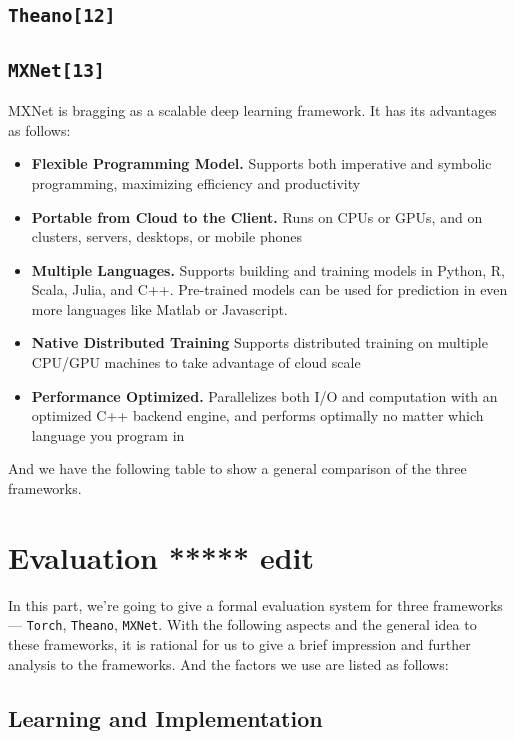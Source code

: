 \documentclass[12pt]{article}
\begin{document}
\subsection{\texttt{Theano[12]}}

\subsection{\texttt{MXNet[13]}}
MXNet is bragging as a scalable deep learning framework. It has its advantages as follows:
\begin{itemize}	
	\item {\bf Flexible Programming Model.} Supports both imperative and symbolic programming, maximizing efficiency and productivity
	\item {\bf Portable from Cloud to the Client.} Runs on CPUs or GPUs, and on clusters, servers, desktops, or mobile phones 
	\item {\bf Multiple Languages.} Supports building and training models in Python, R, Scala, Julia, and C++. Pre-trained models can be used for prediction in even more languages like Matlab or Javascript.
	\item {\bf Native Distributed Training} Supports distributed training on multiple CPU/GPU machines to take advantage of cloud scale
	\item {\bf Performance Optimized.} Parallelizes both I/O and computation with an optimized C++ backend engine, and performs optimally no matter which language you program in
\end{itemize}
And we have the following table to show a general comparison of the three frameworks.


\section{Evaluation ***** edit}
In this part, we're going to give a formal evaluation system for three frameworks --- \texttt{Torch}, \texttt{Theano}, \texttt{MXNet}. With the following aspects and the general idea to these frameworks, it is rational for us to give a brief impression and further analysis to the frameworks. And the factors we use are listed as follows:
\subsection{Learning and Implementation}
\end{document}

